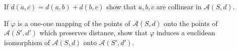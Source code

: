 If $d(a, c) = d(a, b) + d(b, c)$ show that $a, b, c$ are collinear in $\mathcal{A}(S, d)$.

If $\varphi$ is a one-one mapping of the points of $\mathcal{A}(S, d)$ onto the points of $\mathcal{A}(S', d')$ which preserves distance, show that $\varphi$ induces a euclidean isomorphism of $\mathcal{A}(S, d)$ onto $\mathcal{A}(S', d')$.
